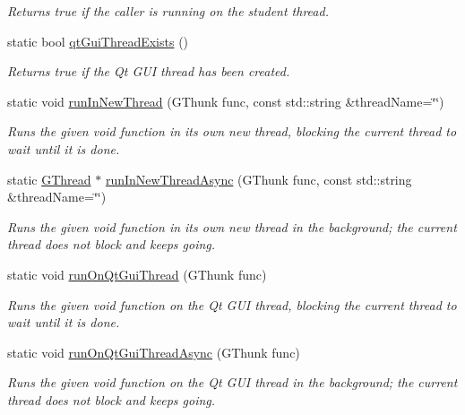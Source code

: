 \begin{DoxyCompactItemize}
\begin{DoxyCompactList}\small\item\em Returns true if the caller is running on the student thread. \end{DoxyCompactList}\item 
static bool \mbox{\hyperlink{classGThread_afee663b5d7998135c2aab0585b2ad37f}{qt\+Gui\+Thread\+Exists}} ()
\begin{DoxyCompactList}\small\item\em Returns true if the Qt G\+UI thread has been created. \end{DoxyCompactList}\item 
static void \mbox{\hyperlink{classGThread_ad70a32318f3f0a9cf25582379c6d7ffb}{run\+In\+New\+Thread}} (G\+Thunk func, const std\+::string \&thread\+Name=\char`\"{}\char`\"{})
\begin{DoxyCompactList}\small\item\em Runs the given void function in its own new thread, blocking the current thread to wait until it is done. \end{DoxyCompactList}\item 
static \mbox{\hyperlink{classGThread}{G\+Thread}} $\ast$ \mbox{\hyperlink{classGThread_aee1af0236d033fce36073899bb4368ed}{run\+In\+New\+Thread\+Async}} (G\+Thunk func, const std\+::string \&thread\+Name=\char`\"{}\char`\"{})
\begin{DoxyCompactList}\small\item\em Runs the given void function in its own new thread in the background; the current thread does not block and keeps going. \end{DoxyCompactList}\item 
static void \mbox{\hyperlink{classGThread_a33da0c87717269710ac7a564a1ebbe64}{run\+On\+Qt\+Gui\+Thread}} (G\+Thunk func)
\begin{DoxyCompactList}\small\item\em Runs the given void function on the Qt G\+UI thread, blocking the current thread to wait until it is done. \end{DoxyCompactList}\item 
static void \mbox{\hyperlink{classGThread_a4445680030c65d610b9e348d8d0cffc8}{run\+On\+Qt\+Gui\+Thread\+Async}} (G\+Thunk func)
\begin{DoxyCompactList}\small\item\em Runs the given void function on the Qt G\+UI thread in the background; the current thread does not block and keeps going. \end{DoxyCompactList}\item 

\end{DoxyCompactItemize}

